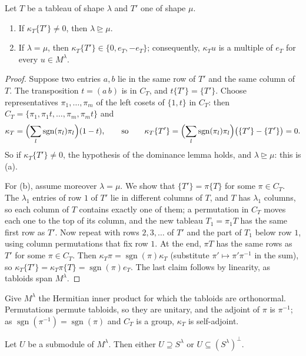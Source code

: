 \begin{lemma}\label{lem:kappa}
Let $T$ be a tableau of shape $\lambda$ and $T'$ one of shape $\mu$.
\begin{enumerate}[label=(\alph*)]
\item If $\kappa_T\{T'\}\ne0$, then $\lambda\trianglerighteq\mu$.
\item If $\lambda=\mu$, then $\kappa_T\{T'\}\in\{0,e_T,-e_T\}$; consequently, $\kappa_Tu$ is a multiple of $e_T$ for every $u\in M^\lambda$.
\end{enumerate}
\end{lemma}

\begin{proof}
Suppose two entries $a,b$ lie in the same row of $T'$ and the same column of $T$. The transposition $t=(a\,b)$ is in $C_T$, and $t\{T'\}=\{T'\}$. Choose representatives $\pi_1,\dots,\pi_m$ of the left cosets of $\{1,t\}$ in $C_T$: then
$C_T=\{\pi_1,\pi_1t,\dots,\pi_m,\pi_mt\}$ and
\[
\kappa_T=\Bigl(\sum_{l}\operatorname{sgn}(\pi_l)\pi_l\Bigr)(1-t),\qquad\text{so}\qquad\kappa_T\{T'\}=\Bigl(\sum_{l}\operatorname{sgn}(\pi_l)\pi_l\Bigr)\bigl(\{T'\}-\{T'\}\bigr)=0.
\]
So if $\kappa_T\{T'\}\ne0$, the hypothesis of the dominance lemma holds, and $\lambda\trianglerighteq\mu$: this is (a).

For (b), assume moreover $\lambda=\mu$. We show that $\{T'\}=\pi\{T\}$ for some $\pi\in C_T$. The $\lambda_1$ entries of row $1$ of $T'$ lie in different columns of $T$, and $T$ has $\lambda_1$ columns, so each column of $T$ contains exactly one
of them; a permutation in $C_T$ moves each one to the top of its column, and the new tableau $T_1=\pi_1T$ has the same first row as $T'$. Now repeat with rows $2,3,\dots$ of $T'$ and the part of $T_1$ below row $1$, using
column permutations that fix row $1$. At the end, $\pi T$ has the same rows as $T'$ for some $\pi\in C_T$. Then $\kappa_T\pi=\operatorname{sgn}(\pi)\kappa_T$ (substitute $\pi'\mapsto\pi'\pi^{-1}$ in the sum), so
$\kappa_T\{T'\}=\kappa_T\pi\{T\}=\operatorname{sgn}(\pi)e_T$. The last claim follows by linearity, as tabloids span $M^\lambda$.
\end{proof}

Give $M^\lambda$ the Hermitian inner product for which the tabloids are orthonormal. Permutations permute tabloids, so they are unitary, and the adjoint of $\pi$ is $\pi^{-1}$; as $\operatorname{sgn}(\pi^{-1})=\operatorname{sgn}(\pi)$ and
$C_T$ is a group, $\kappa_T$ is self-adjoint.

\begin{theorem}\label{thm:james}
Let $U$ be a submodule of $M^\lambda$. Then either $U\supseteq S^\lambda$ or $U\subseteq(S^\lambda)^\perp$.
\end{theorem}

